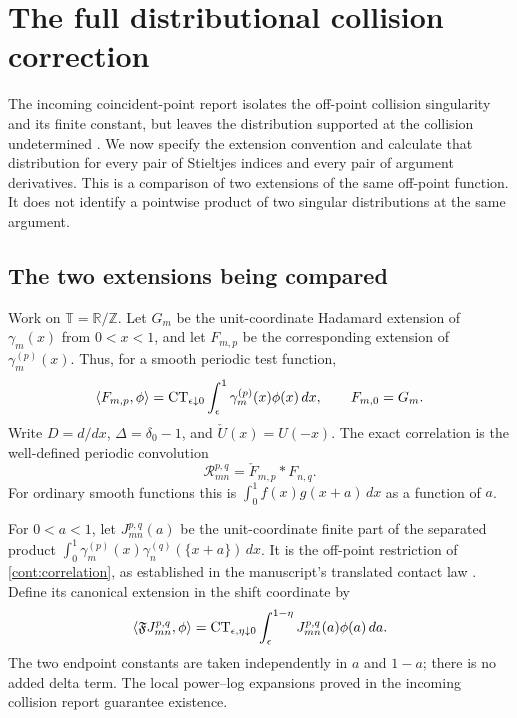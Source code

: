 \section{The full distributional collision correction}
\label{cont:sec}

The incoming coincident-point report isolates the off-point collision
singularity and its finite constant, but leaves the distribution
supported at the collision undetermined \cite{IncomingCoincident}.
We now specify the extension convention and calculate that distribution
for every pair of Stieltjes indices and every pair of argument
derivatives.  This is a comparison of two extensions of the same
off-point function.  It does not identify a pointwise product of two
singular distributions at the same argument.

\subsection{The two extensions being compared}

Work on $\mathbb T=\mathbb R/\mathbb Z$.  Let $G_m$ be the unit-coordinate
Hadamard extension of $\gamma_m(x)$ from $0<x<1$, and let
$F_{m,p}$ be the corresponding extension of
$\gamma_m^{(p)}(x)$.  Thus, for a smooth periodic test function,
\begin{equation}\label{cont:finite-part}
 \langle F_{m,p},\phi\rangle
 =\operatorname{CT}_{\epsilon\downarrow0}
      \int_\epsilon^1\gamma_m^{(p)}(x)\phi(x)\,dx,
 \qquad F_{m,0}=G_m.
\end{equation}
Write $D=d/dx$, $\Delta=\delta_0-1$, and
$\check U(x)=U(-x)$.  The exact correlation is the well-defined
periodic convolution
\begin{equation}\label{cont:correlation}
 \mathcal R_{mn}^{p,q}=\check F_{m,p}*F_{n,q}.
\end{equation}
For ordinary smooth functions this is
$\int_0^1 f(x)g(x+a)\,dx$ as a function of $a$.

For $0<a<1$, let $J_{mn}^{p,q}(a)$ be the unit-coordinate finite part
of the separated product
$\int_0^1\gamma_m^{(p)}(x)\gamma_n^{(q)}(\{x+a\})\,dx$.
It is the off-point restriction of \eqref{cont:correlation}, as
established in the manuscript's translated contact law
\cite{Repo}.  Define its canonical extension in the shift coordinate by
\begin{equation}\label{cont:shift-extension}
 \left\langle\mathfrak F J_{mn}^{p,q},\phi\right\rangle
 =\operatorname{CT}_{\epsilon,\eta\downarrow0}
      \int_\epsilon^{1-\eta}J_{mn}^{p,q}(a)\phi(a)\,da.
\end{equation}
The two endpoint constants are taken independently in $a$ and $1-a$;
there is no added delta term.  The local power--log expansions proved
in the incoming collision report guarantee existence.

